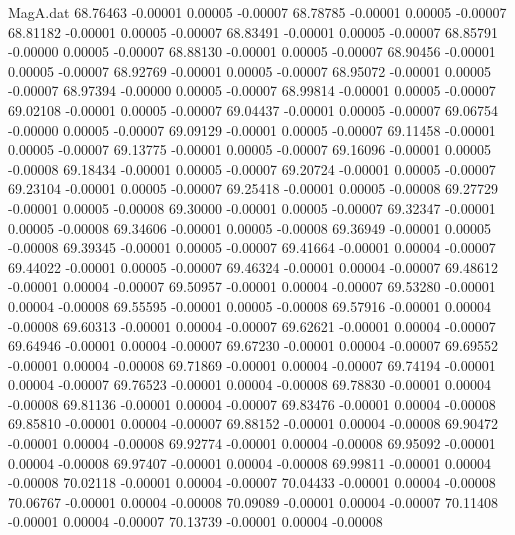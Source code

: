 \begin{filecontents}{MagA.dat}
  68.76463   -0.00001    0.00005   -0.00007
  68.78785   -0.00001    0.00005   -0.00007
  68.81182   -0.00001    0.00005   -0.00007
  68.83491   -0.00001    0.00005   -0.00007
  68.85791   -0.00000    0.00005   -0.00007
  68.88130   -0.00001    0.00005   -0.00007
  68.90456   -0.00001    0.00005   -0.00007
  68.92769   -0.00001    0.00005   -0.00007
  68.95072   -0.00001    0.00005   -0.00007
  68.97394   -0.00000    0.00005   -0.00007
  68.99814   -0.00001    0.00005   -0.00007
  69.02108   -0.00001    0.00005   -0.00007
  69.04437   -0.00001    0.00005   -0.00007
  69.06754   -0.00000    0.00005   -0.00007
  69.09129   -0.00001    0.00005   -0.00007
  69.11458   -0.00001    0.00005   -0.00007
  69.13775   -0.00001    0.00005   -0.00007
  69.16096   -0.00001    0.00005   -0.00008
  69.18434   -0.00001    0.00005   -0.00007
  69.20724   -0.00001    0.00005   -0.00007
  69.23104   -0.00001    0.00005   -0.00007
  69.25418   -0.00001    0.00005   -0.00008
  69.27729   -0.00001    0.00005   -0.00008
  69.30000   -0.00001    0.00005   -0.00007
  69.32347   -0.00001    0.00005   -0.00008
  69.34606   -0.00001    0.00005   -0.00008
  69.36949   -0.00001    0.00005   -0.00008
  69.39345   -0.00001    0.00005   -0.00007
  69.41664   -0.00001    0.00004   -0.00007
  69.44022   -0.00001    0.00005   -0.00007
  69.46324   -0.00001    0.00004   -0.00007
  69.48612   -0.00001    0.00004   -0.00007
  69.50957   -0.00001    0.00004   -0.00007
  69.53280   -0.00001    0.00004   -0.00008
  69.55595   -0.00001    0.00005   -0.00008
  69.57916   -0.00001    0.00004   -0.00008
  69.60313   -0.00001    0.00004   -0.00007
  69.62621   -0.00001    0.00004   -0.00007
  69.64946   -0.00001    0.00004   -0.00007
  69.67230   -0.00001    0.00004   -0.00007
  69.69552   -0.00001    0.00004   -0.00008
  69.71869   -0.00001    0.00004   -0.00007
  69.74194   -0.00001    0.00004   -0.00007
  69.76523   -0.00001    0.00004   -0.00008
  69.78830   -0.00001    0.00004   -0.00008
  69.81136   -0.00001    0.00004   -0.00007
  69.83476   -0.00001    0.00004   -0.00008
  69.85810   -0.00001    0.00004   -0.00007
  69.88152   -0.00001    0.00004   -0.00008
  69.90472   -0.00001    0.00004   -0.00008
  69.92774   -0.00001    0.00004   -0.00008
  69.95092   -0.00001    0.00004   -0.00008
  69.97407   -0.00001    0.00004   -0.00008
  69.99811   -0.00001    0.00004   -0.00008
  70.02118   -0.00001    0.00004   -0.00007
  70.04433   -0.00001    0.00004   -0.00008
  70.06767   -0.00001    0.00004   -0.00008
  70.09089   -0.00001    0.00004   -0.00007
  70.11408   -0.00001    0.00004   -0.00007
  70.13739   -0.00001    0.00004   -0.00008

\end{filecontents}
